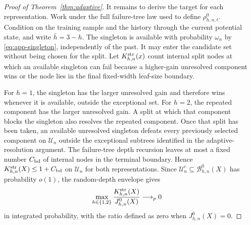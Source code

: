 \begin{appendix}
\begin{proof}[Proof of Theorem~\ref{thm:adaptive}]
It remains to derive the target for each representation. Work under the full
failure-tree law used to define
\(\rho_{h,n,t}^0\). Condition on the training sample and the history through the
current potential state, and write \(\bar h=3-h\).
The singleton is available with probability \(\omega_n\) by
\eqref{eq:app-singleton}, independently of the past. It may enter the candidate
set without being chosen for the split. Let \(K_{h,n}^{\rm str}(x)\) count internal split nodes
at which an available singleton can fail because a higher-gain unresolved
component wins or the node lies in the final fixed-width leaf-size boundary.

For \(h=1\), the singleton has the larger unresolved gain and therefore wins
whenever it is available, outside the exceptional set. For \(h=2\), the repeated
component has the larger unresolved gain. A split at which that component
blocks the singleton also resolves the repeated component. Once that split has
been taken, an
available unresolved singleton defeats every previously selected component on
\(\mathcal U_n\) outside the exceptional subtrees identified in the
adaptive-resolution argument. The failure-tree depth recursion leaves at most
a fixed number \(C_{\rm bd}\) of internal
nodes in the terminal boundary. Hence
\(K_{h,n}^{\rm str}(X)\le 1+C_{\rm bd}\) on
\(\mathcal U_n\) for both representations. Since
\(\mathcal U_n^c\subseteq\mathcal B_{h,n}^0(X)\) has probability \(o(1)\), the
random-depth envelope gives
\begin{equation}\label{eq:app-structural-node-share}
\max_{h\in\{1,2\}}
\frac{K_{h,n}^{\rm str}(X)}{J_{h,n}^0(X)}\longrightarrow_p0
\end{equation}
in integrated probability, with the ratio defined as zero when
\(J_{h,n}^0(X)=0\).


\end{proof}
\end{appendix}
